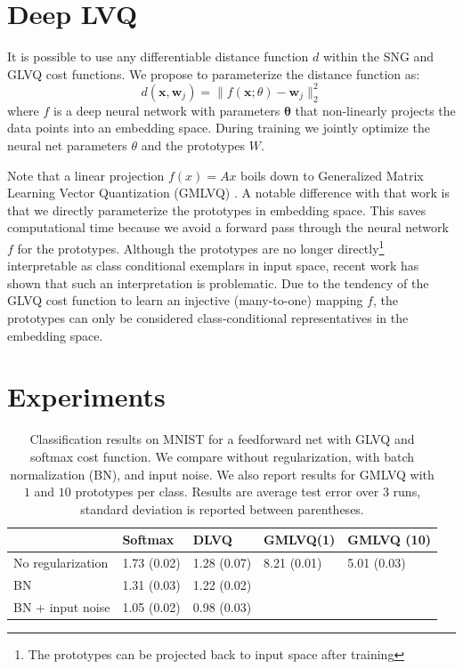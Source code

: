 \documentclass{esannV2}
\begin{document}
\section{Deep LVQ}
It is possible to use any differentiable distance function $d$ within the SNG and GLVQ cost functions. We propose to parameterize the distance function as:
\begin{equation}
 d(\mathbf{x}, \mathbf{w}_j) = \|f(\mathbf{x}; \theta) - \mathbf{w}_j\|^2_2
\end{equation}
where $f$ is a deep neural network with parameters $\mathbf{\theta}$ that non-linearly projects the data points into an embedding space. During training we jointly optimize the neural net parameters $\theta$ and the prototypes $W$. 

Note that a linear projection $f(x) = Ax$ boils down to Generalized Matrix Learning Vector Quantization (GMLVQ) \cite{schneider2009adaptive,bunte2012limited}. A notable difference with that work is that we directly parameterize the prototypes in embedding space. This saves computational time because we avoid a forward pass through the neural network $f$ for the prototypes. Although the prototypes are no longer directly\footnote{The prototypes can be projected back to input space after training} interpretable as class conditional exemplars in input space, recent work\cite{de2013stationarity} has shown that such an interpretation is problematic. Due to the tendency of the GLVQ cost function to learn an injective (many-to-one) mapping $f$, the prototypes can only be considered class-conditional representatives in the embedding space. 


\section{Experiments}
\begin{table}
\caption{Classification results on MNIST for a feedforward net with GLVQ and softmax cost function. We compare without regularization, with batch normalization (BN), and input noise. We also report results for GMLVQ with $1$ and $10$ prototypes per class. Results are average test error over 3 runs, standard deviation is reported between parentheses. }
\label{table:results}
 \begin{tabular}{l||llll}
  & Softmax & DLVQ & GMLVQ(1) & GMLVQ (10)\\
 \hline
 No regularization & 1.73 (0.02) & 1.28 (0.07) & 8.21 (0.01) & 5.01 (0.03)\\
 BN & 1.31 (0.03) & 1.22 (0.02)& &\\
 BN + input noise & 1.05 (0.02) & 0.98 (0.03)&&
 \end{tabular}
\end{table}
\end{document}
